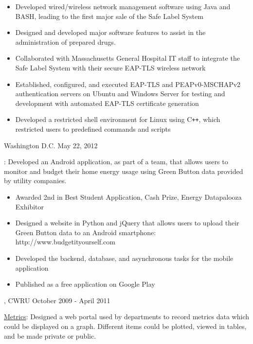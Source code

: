 \documentclass[10pt, letterpaper]{article}
\begin{document}
\begin{itemize}
\item Developed wired/wireless network management software using Java and BASH, leading to the first major sale of the Safe Label System
\item Designed and developed major software features to assist in the administration of prepared drugs.
\item Collaborated with Massachusetts General Hospital IT staff to integrate the Safe Label System with their secure EAP-TLS wireless network
\item Established, configured, and executed EAP-TLS and PEAPv0-MSCHAPv2 authentication servers on Ubuntu and Windows Server for testing and development with automated EAP-TLS certificate generation
\item Developed a restricted shell environment for Linux using C{}\verb!++!, which restricted users to predefined commands and scripts
\end{itemize}

\bigskip
{}  \hfill Washington D.C. \hfill May 22, 2012

\hangindent=15pt
: Developed an Android application, as part of a team, that allows users to monitor and budget their home energy usage using Green Button data provided by utility companies.

\begin{itemize}
\item Awarded 2nd in Best Student Application, Cash Prize, Energy Datapalooza Exhibitor
\item Designed a website in Python and jQuery that allows users to upload their Green Button data to an Android smartphone: http://www.budgetityourself.com
\item Developed the backend, database, and asynchronous tasks for the mobile application
\item Published as a free application on Google Play
\end{itemize}
\bigskip
{},   \hfill CWRU \hfill October 2009 - April 2011

\hangindent=15pt
 \underline{Metrics}: Designed a web portal used by departments to record metrics data which could be displayed on a graph. Different items could be plotted, viewed in tables, and be made private or public.
\end{document}
